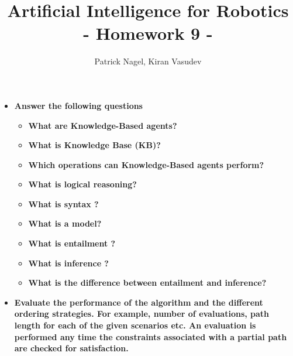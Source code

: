 \documentclass[11pt]{article}
\title{Artificial Intelligence for Robotics\\
- Homework 9 -}
\author{Patrick Nagel, Kiran Vasudev}
\date{}
\begin{document}
	\maketitle
\begin{itemize}
	\item \textbf{Answer the following questions}
	\begin{itemize}
		\item \textbf{What are Knowledge-Based agents?}
		\item \textbf{What is Knowledge Base (KB)?}
		\item \textbf{Which operations can Knowledge-Based agents perform?}
		\item \textbf{What is logical reasoning?}
		\item \textbf{What is syntax ?}
		\item \textbf{What is a model?}
		\item \textbf{What is entailment ?}
		\item \textbf{What is inference ?}
		\item \textbf{What is the difference between entailment and inference?}
	\end{itemize}
	
	\item \textbf{Evaluate the performance of the algorithm and the different ordering strategies. For example, number of evaluations, path length for each of the given scenarios etc. An evaluation is performed any time the constraints associated with a partial path are checked
		for satisfaction.}
			
\end{itemize}
\end{document}
